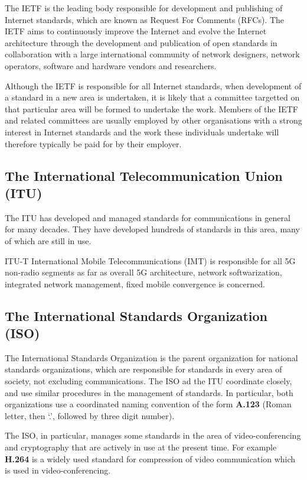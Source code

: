 The IETF is the leading body responsible for development and publishing of
Internet standards, which are known as Request For Comments (RFCs). 
The IETF aims to continuously improve the Internet and
evolve the Internet architecture through the development and publication
of open standards in collaboration with a large international community
of network designers, network operators, software and hardware vendors
and researchers.

Although the IETF is responsible for all Internet standards, when development
of a standard in a new area is undertaken, it is likely that a committee targetted
on that particular area will be formed to undertake the work. Members of the IETF
and related committees are usually employed by other organisations with a strong
interest in Internet standards and the work these individuals undertake will
therefore typically be paid for by their employer.

\subsection{The International Telecommunication Union (ITU)}\label{ITU}

The ITU has developed and managed standards for communications in general
for many decades. They have developed hundreds of standards in this area, many
of which are still in use.

ITU-T International Mobile Telecommunications (IMT) is responsible for all 5G non-radio
segments as far as overall 5G architecture, network softwarization,
integrated network management, fixed mobile convergence is concerned.


\subsection{The International Standards Organization (ISO)}

The International Standards Organization is the parent organization for national standards
organizations, which are responsible for standards in every area of society, not
excluding communications. The ISO ad the ITU coordinate closely, and use similar
procedures in the management of standards. In particular, both organizations use
a coordinated naming convention of the form {\bf A.123} (Roman letter, then `.',
followed by three digit number).

The ISO, in particular, manages some standards in the area of video-conferencing
and cryptography that are actively in use at the present time. For example {\bf H.264}
is a widely used standard for compression of video communication which is used
in video-conferencing.

